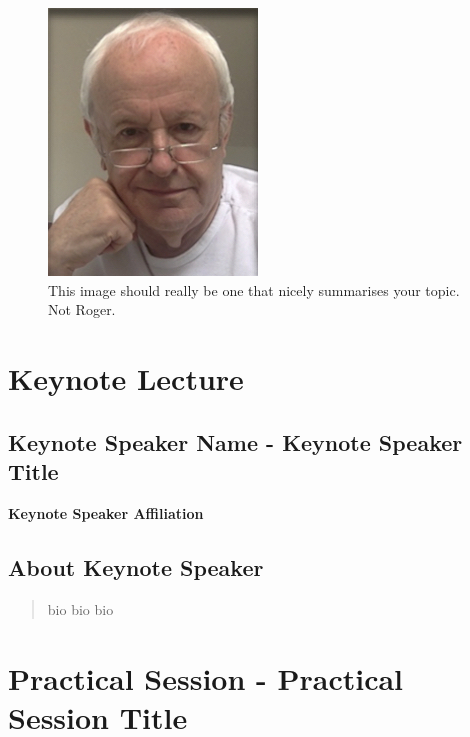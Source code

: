 \documentclass[12pt,]{book}
\begin{document}
\begin{figure}
\includegraphics[width=2.19in]{assets/RPF-thumbnail} \caption{This image should really be one that nicely summarises your topic. Not Roger.}\label{fig:maint}
\end{figure}

\section*{Keynote Lecture}\label{keynote-lecture-7}

\subsection*{Keynote Speaker Name - Keynote Speaker
Title}\label{keynote-speaker-name---keynote-speaker-title-3}

\textbf{Keynote Speaker Affiliation}

\subsection*{About Keynote Speaker}\label{about-keynote-speaker-3}

\begin{quote}
bio bio bio
\end{quote}

\section*{Practical Session - Practical Session
Title}\label{practical-session---practical-session-title-3}
\end{document}
